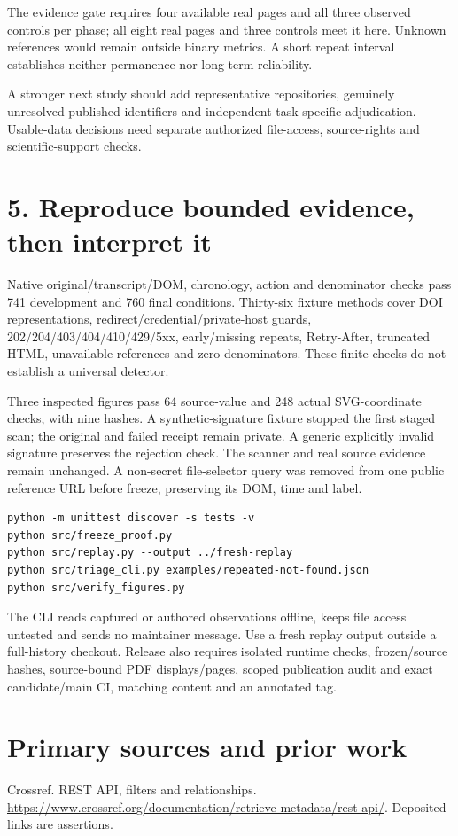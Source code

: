 \documentclass[11pt]{article}
\newcommand{\MDevChecks}{741}
\newcommand{\MFinalChecks}{760}
\newcommand{\MFigureValues}{64}
\newcommand{\MCoordinates}{248}
\begin{document}
The evidence gate requires four available real pages and all three observed controls per phase; all eight real pages and three controls meet it here. Unknown references would remain outside binary metrics. A short repeat interval establishes neither permanence nor long-term reliability.

A stronger next study should add representative repositories, genuinely unresolved published identifiers and independent task-specific adjudication. Usable-data decisions need separate authorized file-access, source-rights and scientific-support checks.
\newpage
\section*{5. Reproduce bounded evidence, then interpret it}
Native original/transcript/DOM, chronology, action and denominator checks pass \MDevChecks{} development and \MFinalChecks{} final conditions. Thirty-six fixture methods cover DOI representations, redirect/credential/private-host guards, 202/204/403/404/410/429/5xx, early/missing repeats, Retry-After, truncated HTML, unavailable references and zero denominators. These finite checks do not establish a universal detector.

Three inspected figures pass \MFigureValues{} source-value and \MCoordinates{} actual SVG-coordinate checks, with nine hashes. A synthetic-signature fixture stopped the first staged scan; the original and failed receipt remain private. A generic explicitly invalid signature preserves the rejection check. The scanner and real source evidence remain unchanged. A non-secret file-selector query was removed from one public reference URL before freeze, preserving its DOM, time and label.

\begin{verbatim}
python -m unittest discover -s tests -v
python src/freeze_proof.py
python src/replay.py --output ../fresh-replay
python src/triage_cli.py examples/repeated-not-found.json
python src/verify_figures.py
\end{verbatim}
The CLI reads captured or authored observations offline, keeps file access untested and sends no maintainer message. Use a fresh replay output outside a full-history checkout. Release also requires isolated runtime checks, frozen/source hashes, source-bound PDF displays/pages, scoped publication audit and exact candidate/main CI, matching content and an annotated tag.

\section*{Primary sources and prior work}
\small
Crossref. REST API, filters and relationships. \url{https://www.crossref.org/documentation/retrieve-metadata/rest-api/}. Deposited links are assertions.
\end{document}
